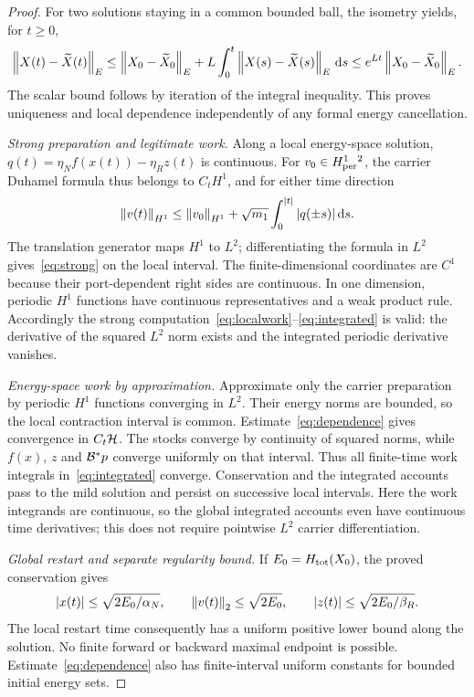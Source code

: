 \begin{proof}
For two solutions staying in a common bounded ball, the isometry yields, for $t\ge0$,
\begin{equation}\label{eq:dependence}
 \left\|X(t)-\widetilde X(t)\right\|_E
 \le\left\|X_0-\widetilde X_0\right\|_E
 +L\int_0^t\left\|X(s)-\widetilde X(s)\right\|_E\,\mathrm d s
 \le e^{Lt}\left\|X_0-\widetilde X_0\right\|_E.
\end{equation}
The scalar bound follows by iteration of the integral inequality. This proves uniqueness and local dependence independently of any formal energy cancellation.

\textit{Strong preparation and legitimate work.}
Along a local energy-space solution, $q(t)=\eta_Nf(x(t))-\eta_Rz(t)$ is continuous. For $v_0\in H^1_{\rm per}{}^2$, the carrier Duhamel formula thus belongs to $C_tH^1$, and for either time direction
\begin{equation}\label{eq:H1estimate}
 \left\|v(t)\right\|_{H^1}\le\left\|v_0\right\|_{H^1}
 +\sqrt{m_1}\int_0^{|t|}|q(\pm s)|\,\mathrm d s.
\end{equation}
The translation generator maps $H^1$ to $L^2$; differentiating the formula in $L^2$ gives~\eqref{eq:strong} on the local interval. The finite-dimensional coordinates are $C^1$ because their port-dependent right sides are continuous. In one dimension, periodic $H^1$ functions have continuous representatives and a weak product rule. Accordingly the strong computation~\eqref{eq:localwork}--\eqref{eq:integrated} is valid: the derivative of the squared $L^2$ norm exists and the integrated periodic derivative vanishes.

\textit{Energy-space work by approximation.}
Approximate only the carrier preparation by periodic $H^1$ functions converging in $L^2$. Their energy norms are bounded, so the local contraction interval is common. Estimate~\eqref{eq:dependence} gives convergence in $C_t\mathcal H$. The stocks converge by continuity of squared norms, while $f(x)$, $z$ and $\mathcal B^*p$ converge uniformly on that interval. Thus all finite-time work integrals in~\eqref{eq:integrated} converge. Conservation and the integrated accounts pass to the mild solution and persist on successive local intervals. Here the work integrands are continuous, so the global integrated accounts even have continuous time derivatives; this does not require pointwise $L^2$ carrier differentiation.

\textit{Global restart and separate regularity bound.}
If $E_0=H_{\rm tot}(X_0)$, the proved conservation gives
\begin{equation}\label{eq:coercive}
 |x(t)|\le\sqrt{2E_0/\alpha_N},\qquad
 \left\|v(t)\right\|_2\le\sqrt{2E_0},\qquad
 |z(t)|\le\sqrt{2E_0/\beta_R}.
\end{equation}
The local restart time consequently has a uniform positive lower bound along the solution. No finite forward or backward maximal endpoint is possible. Estimate~\eqref{eq:dependence} also has finite-interval uniform constants for bounded initial energy sets.


\end{proof}
